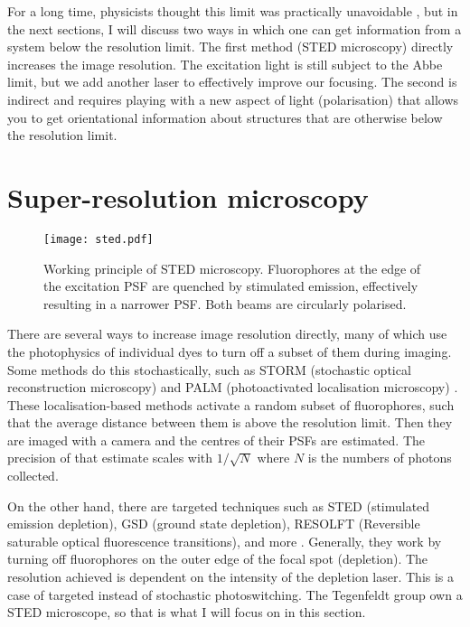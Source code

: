 For a long time, physicists thought this limit was practically unavoidable \cite{McCutchen1967}, but in the next sections, I will discuss two ways in which one can get information from a system below the resolution limit. The first method (STED microscopy) directly increases the image resolution. The excitation light is still subject to the Abbe limit, but we add another laser to effectively improve our focusing. The second is indirect and requires playing with a new aspect of light (polarisation) that allows you to get orientational information about structures that are otherwise below the resolution limit.

\section{Super-resolution microscopy}

\begin{figure}
	\centering
	\texttt{[image: sted.pdf]}
	\caption{
		Working principle of STED microscopy. Fluorophores at the edge of the excitation PSF are quenched by stimulated emission, effectively resulting in a narrower PSF. Both beams are circularly polarised. 
	}
	\label{fig:sted principle}
\end{figure}

There are several ways to increase image resolution directly, many of which use the photophysics of individual dyes to turn off a subset of them during imaging. Some methods do this stochastically, such as STORM (stochastic optical reconstruction microscopy) and PALM (photoactivated localisation microscopy) \cite{Mock2009, Betzig2006}. These localisation-based methods activate a random subset of fluorophores, such that the average distance between them is above the resolution limit. Then they are imaged with a camera and the centres of their PSFs are estimated. The precision of that estimate scales with $ 1/\sqrt{N} $ where $ N $ is the numbers of photons collected.

On the other hand, there are targeted techniques such as STED (stimulated emission depletion), GSD (ground state depletion), RESOLFT (Reversible saturable optical fluorescence transitions), and more \cite{Klar2000, Folling2008, Hofmann2005}. Generally, they work by turning off fluorophores on the outer edge of the focal spot (depletion). The resolution achieved is dependent on the intensity of the depletion laser. This is a case of targeted instead of stochastic photoswitching. The Tegenfeldt group own a STED microscope, so that is what I will focus on in this section. 

